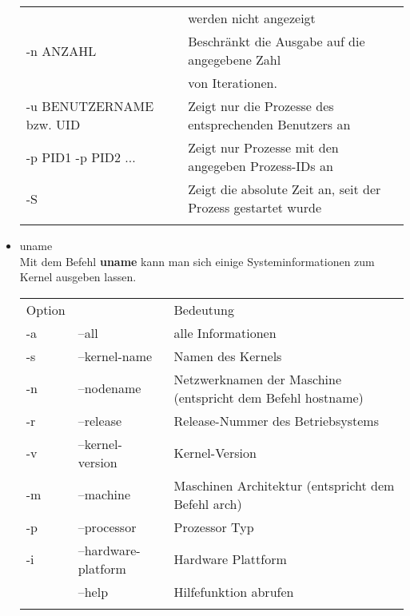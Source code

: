 \begin{itemize}
\begin{tabular}{ll}
				& werden nicht angezeigt\\
				-n ANZAHL & Beschr\"ankt die Ausgabe auf die angegebene Zahl\\
				& von Iterationen.\\
				-u BENUTZERNAME bzw. UID & Zeigt nur die Prozesse des entsprechenden Benutzers an\\
				-p PID1 -p PID2 ... & Zeigt nur Prozesse mit den angegeben Prozess-IDs an\\
				-S & Zeigt die absolute Zeit an, seit der Prozess gestartet wurde\\ \\
			\end{tabular}
			\item uname\\
			Mit dem Befehl \textbf{uname} kann man sich einige Systeminformationen zum Kernel ausgeben lassen.\\
			\begin{tabular}{lll}
				Option & & Bedeutung \\
				-a & --all & alle Informationen\\
				-s & --kernel-name & Namen des Kernels\\
				-n & --nodename &  Netzwerknamen der Maschine (entspricht dem Befehl hostname)\\
				-r & --release & Release-Nummer des Betriebsystems\\
				-v & --kernel-version & Kernel-Version\\
				-m & --machine & Maschinen Architektur (entspricht dem Befehl arch)\\
				-p & --processor & Prozessor Typ\\
				-i & --hardware-platform & Hardware Plattform\\
				& --help & Hilfefunktion abrufen\\ \\
			\end{tabular}
		\end{itemize}
